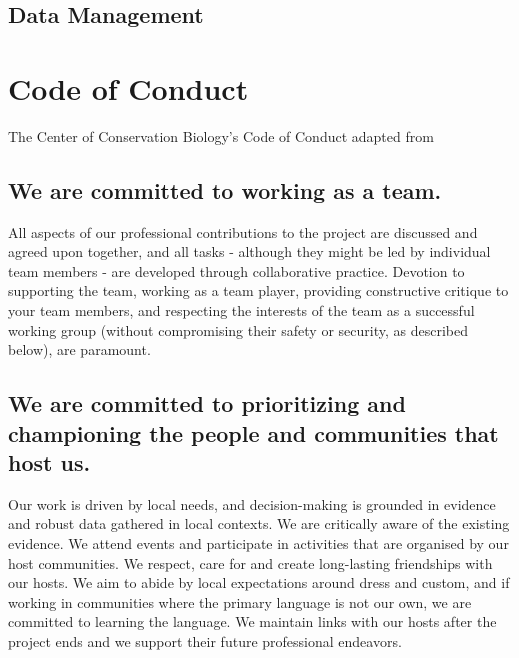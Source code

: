 \documentclass[
]{book}
\begin{document}
\hypertarget{data-management}{%
\section{Data Management}\label{data-management}}

\hypertarget{codeofconduct}{%
\chapter{Code of Conduct}\label{codeofconduct}}

The Center of Conservation Biology's Code of Conduct adapted from \citep{Perry_2018}

\hypertarget{we-are-committed-to-working-as-a-team.}{%
\section{We are committed to working as a team.}\label{we-are-committed-to-working-as-a-team.}}

All aspects of our professional contributions to the project are discussed and agreed upon together, and all tasks - although they might be led by individual team members - are developed through collaborative practice. Devotion to supporting the team, working as a team player, providing constructive critique to your team members, and respecting the interests of the team as a successful working group (without compromising their safety or security, as described below), are paramount.

\hypertarget{we-are-committed-to-prioritizing-and-championing-the-people-and-communities-that-host-us.}{%
\section{We are committed to prioritizing and championing the people and communities that host us.}\label{we-are-committed-to-prioritizing-and-championing-the-people-and-communities-that-host-us.}}

Our work is driven by local needs, and decision-making is grounded in evidence and robust data gathered in local contexts. We are critically aware of the existing evidence. We attend events and participate in activities that are organised by our host communities. We respect, care for and create long-lasting friendships with our hosts. We aim to abide by local expectations around dress and custom, and if working in communities where the primary language is not our own, we are committed to learning the language. We maintain links with our hosts after the project ends and we support their future professional endeavors.
\end{document}
